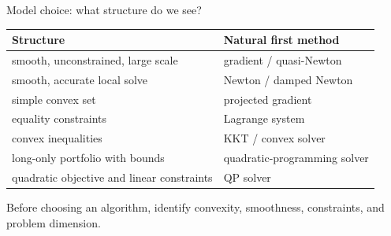 \documentclass[aspectratio=169,11pt]{beamer}
\begin{document}
\begin{frame}{Model choice: what structure do we see?}
  \begin{center}
    \begin{tabular}{ll}
      \toprule
      Structure & Natural first method \\
      \midrule
      smooth, unconstrained, large scale & gradient / quasi-Newton \\
      smooth, accurate local solve & Newton / damped Newton \\
      simple convex set & projected gradient \\
      equality constraints & Lagrange system \\
      convex inequalities & KKT / convex solver \\
      long-only portfolio with bounds & quadratic-programming solver \\
      quadratic objective and linear constraints & QP solver \\
      \bottomrule
    \end{tabular}
  \end{center}

  Before choosing an algorithm, identify convexity, smoothness, constraints, and
  problem dimension.
\end{frame}
\end{document}
